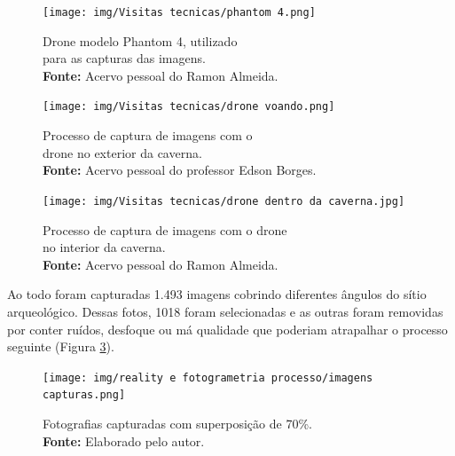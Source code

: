 \begin{figure}[H]
    \centering
    \begin{minipage}{0.45\textwidth} %
        \centering
    \texttt{[image: img/Visitas tecnicas/phantom 4.png]}
    \caption{ Drone modelo Phantom 4, utilizado \\ para as capturas das imagens.\\
        \textbf{Fonte:} Acervo pessoal do Ramon Almeida.}
    \label{fig:phantom 4}   
    \end{minipage}
    \hspace{1cm} %
    \begin{minipage}{0.45\textwidth} %
        \centering
        \texttt{[image: img/Visitas tecnicas/drone voando.png]}
        \caption{Processo de captura de imagens com o \\ drone no exterior da caverna.\\
            \textbf{Fonte:} Acervo pessoal do professor Edson Borges.}
        \label{fig:drone voando}
    \end{minipage}
\end{figure}

\begin{figure}[H]
    \centering
        \texttt{[image: img/Visitas tecnicas/drone dentro da caverna.jpg]}
        \caption{Processo de captura de imagens com o drone \\
        no interior da caverna. \\
            \textbf{Fonte:} Acervo pessoal do Ramon Almeida.}
        \label{fig:drone dentro da caverna}
\end{figure}

 Ao todo foram capturadas 1.493 imagens cobrindo diferentes ângulos do sítio arqueológico. Dessas fotos, 1018 foram selecionadas e as outras foram removidas por conter ruídos, desfoque ou má qualidade que poderiam atrapalhar o processo seguinte (Figura \ref{fig:fotos tiradas}).

\begin{figure}[H]
    \centering
    \texttt{[image: img/reality e fotogrametria processo/imagens capturas.png]}
    \caption{Fotografias capturadas com superposição de 70\%.\\
        \textbf{Fonte:} Elaborado pelo autor.}
    \label{fig:fotos tiradas}   
\end{figure}

